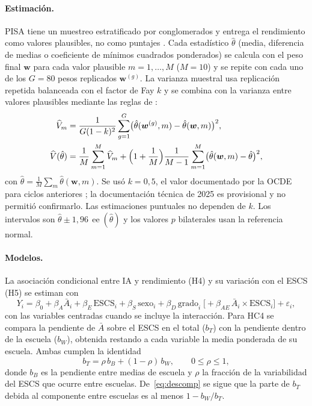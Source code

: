 \documentclass[11pt,a4paper]{article}
\newcommand{\V}{\widehat{V}}
\newcommand{\ee}{\operatorname{ee}}
\begin{document}
\paragraph{Estimación.} PISA tiene un muestreo estratificado por conglomerados y entrega el rendimiento como valores plausibles, no como puntajes \parencite{mislevy1992}. Cada estadístico $\hat\theta$ (media, diferencia de medias o coeficiente de mínimos cuadrados ponderados) se calcula con el peso final $\bm{w}$ para cada valor plausible $m=1,\dots,M$ ($M=10$) y se repite con cada uno de los $G=80$ pesos replicados $\bm{w}^{(g)}$. La varianza muestral usa replicación repetida balanceada con el factor de Fay $k$ \parencite{judkins1990} y se combina con la varianza entre valores plausibles mediante las reglas de \textcite{rubin1987}:
\begin{align}
\V_m&=\frac{1}{G(1-k)^2}\sum_{g=1}^{G}\bigl(\hat\theta(\bm{w}^{(g)},m)-\hat\theta(\bm{w},m)\bigr)^2, \label{eq:fay}\\
\V(\hat\theta)&=\frac1M\sum_{m=1}^{M}\V_m+\Bigl(1+\frac1M\Bigr)\frac{1}{M-1}\sum_{m=1}^{M}\bigl(\hat\theta(\bm{w},m)-\hat\theta\bigr)^2, \label{eq:var}
\end{align}
con $\hat\theta=\tfrac1M\sum_m\hat\theta(\bm{w},m)$. Se usó $k=0{,}5$, el valor documentado por la OCDE para ciclos anteriores \parencite{oecd2009manual}; la documentación técnica de 2025 es provisional y no permitió confirmarlo. Las estimaciones puntuales no dependen de $k$. Los intervalos son $\hat\theta\pm1{,}96\,\ee(\hat\theta)$ y los valores $p$ bilaterales usan la referencia normal.

\paragraph{Modelos.} La asociación condicional entre IA y rendimiento (H4) y su variación con el ESCS (H5) se estiman con
\begin{equation}\label{eq:h4}
Y_i=\beta_0+\beta_A \bar A_i+\beta_E\,\text{ESCS}_i+\beta_S\,\text{sexo}_i+\beta_D\,\text{grado}_i\;\bigl[+\beta_{AE}\,\bar A_i\times\text{ESCS}_i\bigr]+\varepsilon_i ,
\end{equation}
con las variables centradas cuando se incluye la interacción. Para HC4 se compara la pendiente de $\bar A$ sobre el ESCS en el total ($b_T$) con la pendiente dentro de la escuela ($b_W$), obtenida restando a cada variable la media ponderada de su escuela. Ambas cumplen la identidad
\begin{equation}\label{eq:descomp}
b_T=\rho\,b_B+(1-\rho)\,b_W,\qquad 0\le\rho\le1,
\end{equation}
donde $b_B$ es la pendiente entre medias de escuela y $\rho$ la fracción de la variabilidad del ESCS que ocurre entre escuelas. De~\eqref{eq:descomp} se sigue que la parte de $b_T$ debida al componente entre escuelas es al menos $1-b_W/b_T$.
\end{document}
